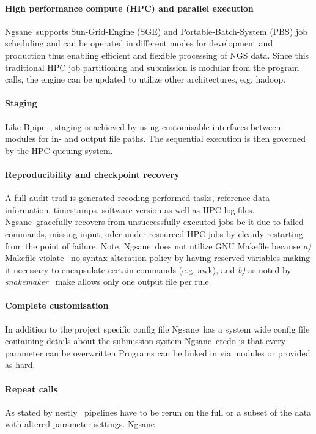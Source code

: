 \documentclass{bioinfo}
\newcommand{\prog}{{\sc Ngsane}}
\begin{document}
\paragraph{High performance compute (HPC) and parallel execution} 
\prog\ supports Sun-Grid-Engine (SGE) and Portable-Batch-System (PBS) job scheduling and can be operated in different modes for development and production thus enabling efficient and flexible processing of NGS data. 
Since this traditional HPC job partitioning and submission is modular from the program calls, the engine can be updated to utilize other architectures, e.g. hadoop. 

\paragraph{Staging}
Like {\sc Bpipe}~\cite{Sadedin2012}, staging is achieved by using customisable interfaces between modules for in- and output file paths. 
The sequential execution is then governed by the HPC-queuing system.

\paragraph{Reproducibility and checkpoint recovery}
A full audit trail is generated recoding performed tasks, reference data information, timestamps, software version as well as HPC log files. 
\prog\ gracefully recovers from unsuccessfully executed jobs be it due to failed commands, missing input, oder under-resourced HPC jobs by cleanly
restarting from the point of failure. 
Note, \prog\ does not utilize {\sc GNU Makefile} because {\it a)} {\sc Makefile} violate \progs\ no-syntax-alteration policy by having reserved variables making it necessary to encapsulate certain commands (e.g. awk), and {\it b)} as noted by {\it snakemaker}~\cite{Koester2012} make allows only one output file per rule.   

\paragraph{Complete customisation}
In addition to the project specific config file \prog\ has a system wide config file containing details about the submission system  
\prog\ credo is that every parameter can be overwritten 
Programs can be linked in via modules or provided as hard.

\paragraph{Repeat calls}
As stated by {\sc nestly}~\cite{McCoy2013} pipelines have to be rerun on the full or a subset of the data with altered parameter settings. 
\prog\  
\end{document}
